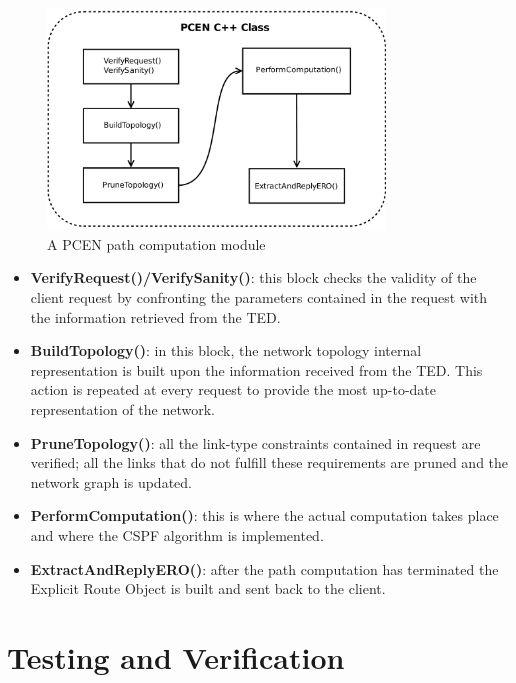 \documentclass[10pt,a4paper]{report}
\begin{document}
\begin{figure}[!htbp]
  \begin{center}
    \includegraphics[width=0.8\textwidth]{img/pcen_module}
    \caption[PCEN computation module]{A PCEN path computation module}
    \label{fig:pcen_module}
  \end{center}
\end{figure}

\begin{itemize}
\item \textbf{VerifyRequest()/VerifySanity()}: this block checks the validity
  of the client request by confronting the parameters contained in the
  request with the information retrieved from the TED.
\item \textbf{BuildTopology()}: in this block, the network topology
  internal representation is built upon the information received from
  the TED. This action is repeated at every request to provide the
  most up-to-date representation of the network.
\item \textbf{PruneTopology()}: all the link-type constraints
  contained in request are verified; all the links that do not fulfill
  these requirements are pruned and the network graph is updated.
\item \textbf{PerformComputation()}: this is where the actual
  computation takes place and where the CSPF algorithm is implemented.
\item \textbf{ExtractAndReplyERO()}: after the path computation has
  terminated the Explicit Route Object is built and sent back to the
  client.
\end{itemize}

\clearpage
\mbox{}
\clearpage

\chapter{Testing and Verification}\label{sec:test}
 
\end{document}
